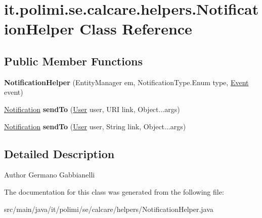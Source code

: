 \hypertarget{classit_1_1polimi_1_1se_1_1calcare_1_1helpers_1_1NotificationHelper}{}\section{it.\+polimi.\+se.\+calcare.\+helpers.\+Notification\+Helper Class Reference}
\label{classit_1_1polimi_1_1se_1_1calcare_1_1helpers_1_1NotificationHelper}
\subsection*{Public Member Functions}
\begin{DoxyCompactItemize}
\item 
\hypertarget{classit_1_1polimi_1_1se_1_1calcare_1_1helpers_1_1NotificationHelper_a6f2aa75f90988ad98887361fe336af60}{}{\bfseries Notification\+Helper} (Entity\+Manager em, Notification\+Type.\+Enum type, \hyperlink{classit_1_1polimi_1_1se_1_1calcare_1_1entities_1_1Event}{Event} event)\label{classit_1_1polimi_1_1se_1_1calcare_1_1helpers_1_1NotificationHelper_a6f2aa75f90988ad98887361fe336af60}

\item 
\hypertarget{classit_1_1polimi_1_1se_1_1calcare_1_1helpers_1_1NotificationHelper_a4577f62220db3084bf93e6ccf646c69a}{}\hyperlink{classit_1_1polimi_1_1se_1_1calcare_1_1entities_1_1Notification}{Notification} {\bfseries send\+To} (\hyperlink{classit_1_1polimi_1_1se_1_1calcare_1_1entities_1_1User}{User} user, U\+R\+I link, Object...\+args)\label{classit_1_1polimi_1_1se_1_1calcare_1_1helpers_1_1NotificationHelper_a4577f62220db3084bf93e6ccf646c69a}

\item 
\hypertarget{classit_1_1polimi_1_1se_1_1calcare_1_1helpers_1_1NotificationHelper_adaddb6170e1c623d0358f52e75cef76d}{}\hyperlink{classit_1_1polimi_1_1se_1_1calcare_1_1entities_1_1Notification}{Notification} {\bfseries send\+To} (\hyperlink{classit_1_1polimi_1_1se_1_1calcare_1_1entities_1_1User}{User} user, String link, Object...\+args)\label{classit_1_1polimi_1_1se_1_1calcare_1_1helpers_1_1NotificationHelper_adaddb6170e1c623d0358f52e75cef76d}

\end{DoxyCompactItemize}


\subsection{Detailed Description}
\begin{DoxyAuthor}{Author}
Germano Gabbianelli 
\end{DoxyAuthor}


The documentation for this class was generated from the following file\+:\begin{DoxyCompactItemize}
\item 
src/main/java/it/polimi/se/calcare/helpers/Notification\+Helper.\+java\end{DoxyCompactItemize}
